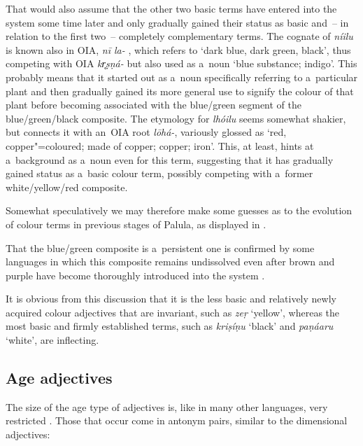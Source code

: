 That would also assume that the other two basic terms have entered into the system some time later
and only gradually gained their status as basic and~-- in relation to the first two~-- completely
complementary terms. The cognate of \textit{níilu} is known also in OIA, \textit{nī la-}
\citep[7563]{turner1966}, which refers to `dark blue, dark green, black', thus competing with OIA
\textit{kr̥ṣṇá-} but also used as a~noun `blue substance; indigo'. This probably means that it
started out as a~noun specifically referring to a~particular plant and then gradually gained its
more general use to signify the colour of that plant before becoming associated with the blue/green
segment of the blue/green/black composite. The etymology for \textit{lhóilu} seems somewhat shakier,
but \citet[11168, 11158]{turner1966} connects it with an~OIA root \textit{lōhá-}, variously glossed
as `red, copper"=coloured; made of copper; copper; iron'. This, at least, hints at a~background as
a~noun even for this term, suggesting that it has gradually gained status as a~basic colour term,
possibly competing with a~former white/yellow/red composite.



Somewhat speculatively we may therefore make some guesses as to the evolution of colour terms in previous stages of Palula, as displayed in .



That the blue/green composite is a~persistent one is confirmed by some languages in which this composite remains undissolved even after brown and purple have become thoroughly introduced into the system \citep[18]{kayetal1991}.



It is obvious from this discussion that it is the less basic and relatively newly acquired colour adjectives that are invariant, such as \textit{zeṛ} `yellow', whereas the most basic and firmly established terms, such as \textit{kriṣíṇu} `black' and \textit{paṇáaru} `white', are inflecting. 


\subsection{Age adjectives}
\label{subsec:6-2-3}


The size of the age type of adjectives is, like in many other languages, very restricted \citep[46]{dixon1982}. Those that occur come in antonym pairs, similar to the dimensional adjectives:




